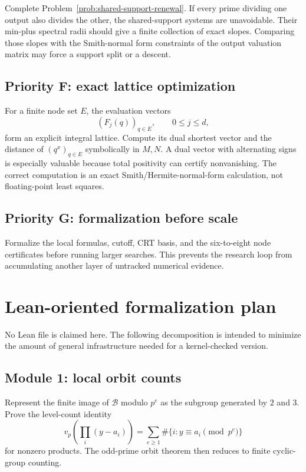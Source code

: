 \documentclass[11pt,oneside]{article}
\theoremstyle{definition}
\theoremstyle{remark}
\newcommand{\B}{\mathcal B}
\begin{document}
Complete Problem~\ref{prob:shared-support-renewal}.  If every prime dividing one output also
divides the other, the shared-support systems are unavoidable.  Their min-plus spectral radii
should give a finite collection of exact slopes.  Comparing those slopes with the Smith-normal
form constraints of the output valuation matrix may force a support split or a descent.

\subsection{Priority F: exact lattice optimization}

For a finite node set \(E\), the evaluation vectors
\[
 (F_j(q))_{q\in E},\qquad 0\le j\le d,
\]
form an explicit integral lattice.  Compute its dual shortest vector and the distance of
\((q^x)_{q\in E}\) symbolically in \(M,N\).  A dual vector with alternating signs is especially
valuable because total positivity can certify nonvanishing.  The correct computation is an
exact Smith/Hermite-normal-form calculation, not floating-point least squares.

\subsection{Priority G: formalization before scale}

Formalize the local formulas, cutoff, CRT basis, and the six-to-eight node certificates before
running larger searches.  This prevents the research loop from accumulating another layer of
untracked numerical evidence.

\section{Lean-oriented formalization plan}
\label{sec:lean-plan}

No Lean file is claimed here.  The following decomposition is intended to minimize the amount
of general infrastructure needed for a kernel-checked version.

\subsection{Module 1: local orbit counts}

Represent the finite image of \(\B\) modulo \(p^e\) as the subgroup generated by \(2\) and
\(3\).  Prove the level-count identity
\[
 v_p\!\left(\prod_i(y-a_i)\right)
 =\sum_{e\ge1}\#\{i:y\equiv a_i\pmod{p^e}\}
\]
for nonzero products.  The odd-prime orbit theorem then reduces to finite cyclic-group
counting.
\end{document}
